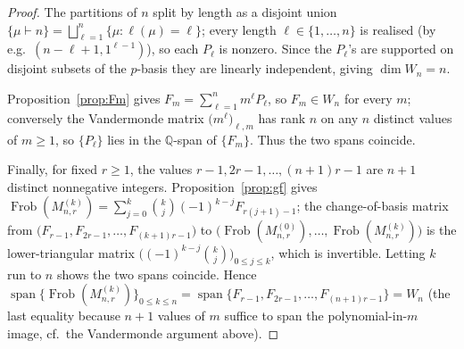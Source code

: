 \documentclass[11pt]{article}
\theoremstyle{definition}
\DeclareMathOperator{\Frob}{Frob}
\DeclareMathOperator{\spann}{span}
\newcommand{\QQ}{\mathbb{Q}}
\begin{document}
\begin{proof}
The partitions of $n$ split by length as a disjoint union
$\{\mu\vdash n\}=\bigsqcup_{\ell=1}^n\{\mu:\ell(\mu)=\ell\}$; every length
$\ell\in\{1,\dots,n\}$ is realised (by e.g.\ $(n-\ell+1,1^{\ell-1})$), so
each $P_\ell$ is nonzero. Since the $P_\ell$'s are supported on disjoint
subsets of the $p$-basis they are linearly independent, giving $\dim
W_n=n$.

Proposition~\ref{prop:Fm} gives $F_m=\sum_{\ell=1}^n m^\ell P_\ell$, so
$F_m\in W_n$ for every $m$; conversely the Vandermonde matrix
$\bigl(m^\ell\bigr)_{\ell,m}$ has rank $n$ on any $n$ distinct values of
$m\ge 1$, so $\{P_\ell\}$ lies in the $\QQ$-span of $\{F_m\}$. Thus the
two spans coincide.

Finally, for fixed $r\ge 1$, the values $r-1,2r-1,\dots,(n+1)r-1$ are $n+1$
distinct nonnegative integers. Proposition~\ref{prop:gf} gives
$\Frob(M_{n,r}^{(k)})=\sum_{j=0}^k\binom{k}{j}(-1)^{k-j}F_{r(j+1)-1}$; the
change-of-basis matrix from $\bigl(F_{r-1},F_{2r-1},\ldots,F_{(k+1)r-1}\bigr)$
to $\bigl(\Frob(M_{n,r}^{(0)}),\ldots,\Frob(M_{n,r}^{(k)})\bigr)$ is the
lower-triangular matrix $\bigl((-1)^{k-j}\binom{k}{j}\bigr)_{0\le j\le k}$,
which is invertible. Letting $k$ run to $n$ shows the two spans coincide.
Hence
$\spann\{\Frob(M_{n,r}^{(k)})\}_{0\le k\le n}=\spann\{F_{r-1},F_{2r-1},\ldots,F_{(n+1)r-1}\}=W_n$
(the last equality because $n+1$ values of $m$ suffice to span the
polynomial-in-$m$ image, cf.\ the Vandermonde argument above).
\end{proof}
\end{document}
